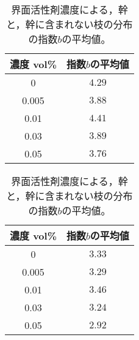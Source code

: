 \documentclass[autodetect-engine,dvi=dvipdfmx,a4paper,ja=standard,oneside,openany,11pt]{bxjsbook}
\begin{document}
\begin{table}[htbp]
  \begin{minipage}{0.45\textwidth}
    \centering
    \caption{界面活性剤濃度による，普通の枝の分布の指数$b$の平均値。}
    \begin{tabular}{|c|c|}
      \hline
      濃度 vol\% & 指数$b$の平均値 \\ \hline\hline
      0        & $4.29$    \\ \hline
      0.005    & $3.88$    \\ \hline
      0.01     & $4.41$    \\ \hline
      0.03     & $3.89$    \\ \hline
      0.05     & $3.76$    \\
      \hline
    \end{tabular}
    \label{tab:brnch_len_exp}
  \end{minipage}
  \hfill
  \begin{minipage}{0.45\textwidth}
    \centering
    \caption{界面活性剤濃度による，幹と，幹に含まれない枝の分布の指数$b$の平均値。}
    \begin{tabular}{|c|c|}
      \hline
      濃度 vol\% & 指数$b$の平均値 \\ \hline\hline
      0        & $3.33$    \\ \hline
      0.005    & $3.29$    \\ \hline
      0.01     & $3.46$    \\ \hline
      0.03     & $3.24$    \\ \hline
      0.05     & $2.92$    \\
      \hline
    \end{tabular}
    \label{tab:branch_len_exp_edited}
  \end{minipage}
\end{table}
\end{document}
